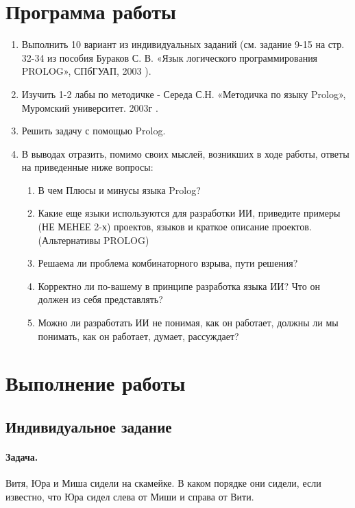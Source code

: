 





\tableofcontents
\newpage

\section{Программа работы}

\begin{enumerate}
	\item Выполнить 10 вариант из индивидуальных заданий (см. задание 9-15 на стр. 32-34 из пособия Бураков С. В. «Язык логического программирования PROLOG», СПбГУАП, 2003 \cite{burakov}).
	\item Изучить 1-2 лабы по методичке - Середа С.Н. «Методичка по языку Prolog», Муромский университет. 2003г \cite{sereda}.
	\item Решить задачу с помощью Prolog.
	\item В выводах отразить, помимо своих мыслей, возникших в ходе работы, ответы на приведенные ниже вопросы:
	\begin{enumerate}
		\item В чем Плюсы и минусы языка Prolog?
		\item Какие еще языки используются для разработки ИИ, приведите примеры (НЕ МЕНЕЕ 2-х) проектов, языков и краткое описание проектов. (Альтернативы PROLOG)
		\item Решаема ли проблема комбинаторного взрыва, пути решения?
		\item Корректно ли по-вашему в принципе разработка языка ИИ? Что он должен из себя представлять?
		\item Можно ли разработать ИИ не понимая, как он работает, должны ли мы понимать, как он работает, думает, рассуждает? 
	\end{enumerate}
\end{enumerate}

\section{Выполнение работы}

\subsection{Индивидуальное задание}

\paragraph{Задача.} Витя, Юра и Миша сидели на скамейке. В каком порядке они
сидели, если известно, что Юра сидел слева от Миши и справа от Вити.


